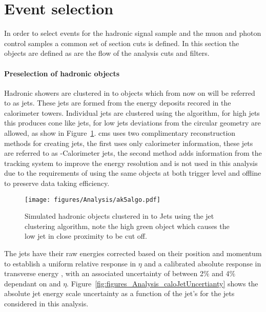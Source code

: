 
\section{Event selection} %
\label{sec:event_selection}
In order to select events for the hadronic signal sample and the muon and 
photon control samples a common set of section cuts is defined. In this section 
the objects are defined as are the flow of the analysis cuts and filters.

\paragraph{Preselection of hadronic objects} %
\label{par:Preselection_of_hadronic_objects}
Hadronic showers are clustered in to objects which from now on will be referred to as jets. These jets are formed from the energy deposits recored in the calorimeter towers. Individual jets are clustered using the \AK algorithm\cite{Cacciari:2008ua}, for high \PT jets this produces cone like jets, for low \PT jets deviations from the circular geometry are allowed, as show in Figure~\ref{fig:figures_Analysis_ak5algo}. \ac{cms} uses two complimentary reconstruction methods for creating jets, the first uses only calorimeter information, these jets are referred to as \AK-Calorimeter jets, the second method adds information from the tracking system to improve the energy resolution and is not used in this analysis due to the requirements of using the same objects at both trigger level and offline to preserve data taking efficiency.

\begin{figure}[htbp]
  \centering
    \texttt{[image: figures/Analysis/ak5algo.pdf]}
  \caption{Simulated hadronic objects clustered in to Jets using the \AK jet clustering algorithm, note the high \PT green object which causes the low \PT jet in close proximity to be cut off.}
  \label{fig:figures_Analysis_ak5algo}
\end{figure}
The jets have their raw energies corrected based on their position and momentum to establish a uniform relative response in $\eta$ and a calibrated absolute 
response in transverse energy \ET, with an associated uncertainty of between 
2$\%$ and 4$\%$ dependant on \ET and $\eta$\cite{Chatrchyan:2011ds}. Figure~\ref{fig:figures_Analysis_caloJetUncertianty} shows the absolute jet energy scale uncertainty as a function of the jet's \PT for the jets considered in this analysis.

